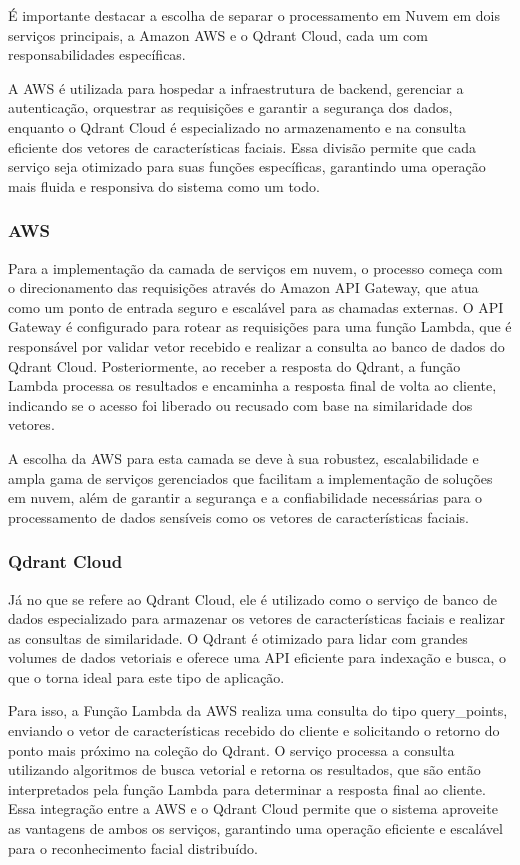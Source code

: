 É importante destacar a escolha de separar o processamento em Nuvem em dois serviços principais, a Amazon AWS e o Qdrant Cloud, cada um com responsabilidades específicas.

A AWS é utilizada para hospedar a infraestrutura de backend, gerenciar a autenticação, orquestrar as requisições e garantir a segurança dos dados, enquanto o Qdrant Cloud é especializado no armazenamento e na consulta eficiente dos vetores de características faciais. Essa divisão permite que cada serviço seja otimizado para suas funções específicas, garantindo uma operação mais fluida e responsiva do sistema como um todo.

\subsubsection{AWS} 
Para a implementação da camada de serviços em nuvem, o processo começa com o direcionamento das requisições através do Amazon API Gateway, que atua como um ponto de entrada seguro e escalável para as chamadas externas. O API Gateway é configurado para rotear as requisições para uma função Lambda, que é responsável por validar vetor recebido e realizar a consulta ao banco de dados do Qdrant Cloud.
Posteriormente, ao receber a resposta do Qdrant, a função Lambda processa os resultados e encaminha a resposta final de volta ao cliente, indicando se o acesso foi liberado ou recusado com base na similaridade dos vetores. 

A escolha da AWS para esta camada se deve à sua robustez, escalabilidade e ampla gama de serviços gerenciados que facilitam a implementação de soluções em nuvem, além de garantir a segurança e a confiabilidade necessárias para o processamento de dados sensíveis como os vetores de características faciais. \cite{aws2026docs}


\subsubsection{Qdrant Cloud}
Já no que se refere ao Qdrant Cloud, ele é utilizado como o serviço de banco de dados especializado para armazenar os vetores de características faciais e realizar as consultas de similaridade. O Qdrant é otimizado para lidar com grandes volumes de dados vetoriais e oferece uma API eficiente para indexação e busca, o que o torna ideal para este tipo de aplicação. \cite{qdrant2024query}

Para isso, a Função Lambda da AWS realiza uma consulta do tipo query\_points, enviando o vetor de características recebido do cliente e solicitando o retorno do ponto mais próximo na coleção do Qdrant. O serviço processa a consulta utilizando algoritmos de busca vetorial e retorna os resultados, que são então interpretados pela função Lambda para determinar a resposta final ao cliente. Essa integração entre a AWS e o Qdrant Cloud permite que o sistema aproveite as vantagens de ambos os serviços, garantindo uma operação eficiente e escalável para o reconhecimento facial distribuído.

